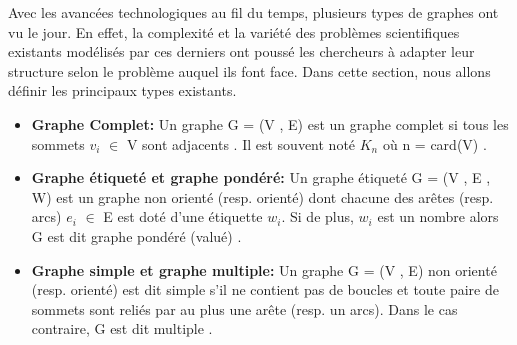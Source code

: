 	Avec les avancées technologiques au fil du temps, plusieurs types de graphes ont vu le jour. En effet, la complexité et la variété des problèmes scientifiques existants modélisés par ces derniers ont poussé les chercheurs à adapter leur structure selon le problème auquel ils font face. Dans cette section, nous allons définir les principaux types existants.
	
		\begin{itemize}[label=$\circ$]
		
			\item \textbf{Graphe Complet:} Un graphe G = (V , E) est un graphe complet si tous les sommets $v_{i}$ $\in$ V sont adjacents \citep{Pres}. Il est souvent noté $K_{n}$ où n = card(V) \citep{DUT}.
				
			
			\item \textbf{Graphe étiqueté et graphe pondéré:}
			 Un graphe étiqueté G = (V , E , W) est un graphe non orienté (resp. orienté) dont chacune des arêtes (resp. arcs) $e_{i}$ $\in$ E est doté d'une étiquette $w_{i}$. Si de plus, $w_{i}$ est un nombre alors G est dit graphe pondéré (valué) \citep{DUT}.
		
			\item \textbf{Graphe simple et graphe multiple:}
			Un graphe G = (V , E) non orienté (resp. orienté) est dit simple s'il ne contient pas de boucles et toute paire de sommets sont reliés par au plus une arête (resp. un arcs). Dans le cas contraire, G est dit multiple \citep{IUTLyonInformatique}.
			
		
		\end{itemize}
		